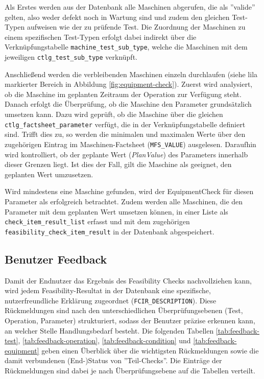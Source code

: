 Als Erstes werden aus der Datenbank alle Maschinen abgerufen, die als ''valide'' gelten, also weder defekt noch in Wartung sind und zudem den gleichen Test-Typen aufweisen wie der zu prüfende Test. Die Zuordnung der Maschinen zu einem spezifischen Test-Typen erfolgt dabei indirekt über die Verknüpfungstabelle \texttt{machine\_\-test\_\-sub\_type}, welche die Maschinen mit dem jeweiligen \texttt{ctlg\_test\_sub\_type} verknüpft.

Anschließend werden die verbleibenden Maschinen einzeln durchlaufen (siehe lila markierter Bereich in Abbildung \ref{fig:equipment-check}). Zuerst wird analysiert, ob die Maschine im geplanten Zeitraum der Operation zur Verfügung steht. Danach erfolgt die Überprüfung, ob die Maschine den Parameter grundsätzlich umsetzen kann. Dazu wird geprüft, ob die Maschine über die gleichen \texttt{ctlg\_factsheet\_parameter} verfügt, die in der Verknüpfungstabelle definiert sind. Trifft dies zu, so werden die minimalen und maximalen Werte über den zugehörigen Eintrag im Maschinen-Factsheet (\texttt{MFS\_VALUE}) ausgelesen. Daraufhin wird kontrolliert, ob der geplante Wert (\textit{PlanValue}) des Parameters innerhalb dieser Grenzen liegt. Ist dies der Fall, gilt die Maschine als geeignet, den geplanten Wert umzusetzen. 

Wird mindestens eine Maschine gefunden, wird der \gls{EquipmentCheck} für diesen Parameter als erfolgreich betrachtet. Zudem werden alle Maschinen, die den Parameter mit dem geplanten Wert umsetzen können, in einer Liste als \texttt{check\_item\_\-result\_\-list} erfasst und mit dem zugehörigen \texttt{feasibility\_check\_item\_result} in der Datenbank abgespeichert.


\subsection{Benutzer Feedback}\label{Subsec:user-feedback}

Damit der Endnutzer das Ergebnis des Feasibility Checks nachvollziehen kann, wird jedem Feasibility-Resultat in der Datenbank eine spezifische, nutzerfreundliche Erklärung zugeordnet (\texttt{FCIR\_DESCRIPTION}). Diese Rückmeldungen sind nach den unterschiedlichen Überprüfungsebenen (Test, Operation, Parameter) strukturiert, sodass der Benutzer präzise erkennen kann, an welcher Stelle Handlungsbedarf besteht. Die folgenden Tabellen \ref{tab:feedback-test}, \ref{tab:feedback-operation}, \ref{tab:feedback-condition} und \ref{tab:feedback-equipment} geben einen Überblick über die wichtigsten Rückmeldungen sowie die damit verbundenen (End-)Status von ''Teil-Checks''. Die Einträge der Rückmeldungen sind dabei je nach Überprüfungsebene auf die Tabellen verteilt.

